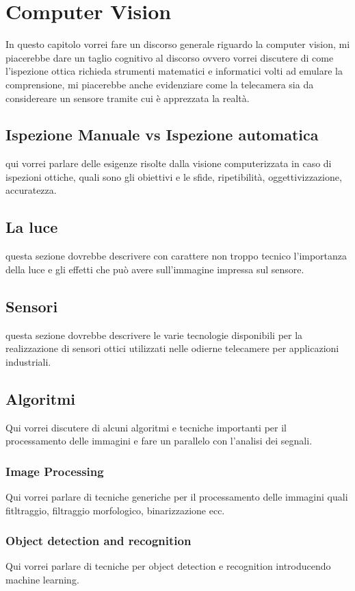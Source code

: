 \chapter{Computer Vision}

In questo capitolo vorrei fare un discorso generale riguardo la computer vision,
mi piacerebbe dare un taglio cognitivo al discorso ovvero vorrei discutere di come
l'ispezione ottica richieda strumenti matematici e informatici volti ad emulare
la comprensione, mi piacerebbe anche evidenziare come la telecamera sia da considereare
un sensore tramite cui è apprezzata la realtà.

\section{Ispezione Manuale vs Ispezione automatica}

qui vorrei parlare delle esigenze risolte dalla visione computerizzata in caso di
ispezioni ottiche, quali sono gli obiettivi e le sfide, ripetibilità, oggettivizzazione,
accuratezza.

\section{La luce}

questa sezione dovrebbe descrivere con carattere non troppo tecnico l'importanza della luce
e gli effetti che può avere sull'immagine impressa sul sensore.

\section{Sensori}

questa sezione dovrebbe descrivere le varie tecnologie disponibili per la realizzazione di
sensori ottici utilizzati nelle odierne telecamere per applicazioni industriali.

\section{Algoritmi}
Qui vorrei discutere di alcuni algoritmi e tecniche importanti per il processamento delle immagini
e fare un parallelo con l'analisi dei segnali.

\subsection{Image Processing}
Qui vorrei parlare di tecniche generiche per il processamento delle immagini quali fitltraggio, filtraggio
morfologico, binarizzazione ecc.

\subsection{Object detection and recognition}	
Qui vorrei parlare di tecniche per object detection e recognition introducendo machine learning.